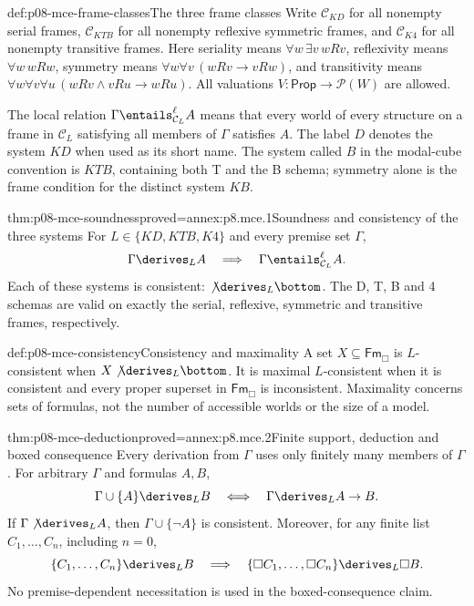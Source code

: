 \begin{hbdefinition}{def:p08-mce-frame-classes}{The three frame classes}
Write \(\mathcal C_{KD}\) for all nonempty serial frames,
\(\mathcal C_{KTB}\) for all nonempty reflexive symmetric frames, and
\(\mathcal C_{K4}\) for all nonempty transitive frames. Here seriality
means \(\forall w\,\exists v\,wRv\), reflexivity means
\(\forall w\,wRw\), symmetry means
\(\forall w\forall v\,(wRv\to vRw)\), and transitivity means
\(\forall w\forall v\forall u\,(wRv\land vRu\to wRu)\).
All valuations \(V:\mathsf{Prop}\to\mathcal{P}(W)\) are allowed.

The local relation \(\Gamma\entails^{\ell}_{\mathcal C_L}A\) means
that every world of every structure on a frame in \(\mathcal C_L\)
satisfying all members of \(\Gamma\) satisfies \(A\).
The label \(D\) denotes the system \(KD\) when used as its short name.
The system called \(B\) in the modal-cube convention is \(KTB\),
containing both T and the B schema; symmetry alone is the frame condition
for the distinct system \(KB\).
\end{hbdefinition}

\begin{hblemma}{thm:p08-mce-soundness}{proved=annex:p8.mce.1}{Soundness and consistency of the three systems}
For \(L\in\{KD,KTB,K4\}\) and every premise set \(\Gamma\),
\[
 \Gamma\derives_L A\quad\Longrightarrow\quad
 \Gamma\entails^{\ell}_{\mathcal C_L}A.
\]
Each of these systems is consistent: \(\not\derives_L\bottom\).
The D, T, B and 4 schemas are valid on exactly the serial, reflexive,
symmetric and transitive frames, respectively.
\end{hblemma}

\begin{hbdefinition}{def:p08-mce-consistency}{Consistency and maximality}
A set \(X\subseteq\mathsf{Fm}_{\Box}\) is \(L\)-consistent when
\(X\not\derives_L\bottom\). It is maximal \(L\)-consistent when
it is consistent and every proper superset in \(\mathsf{Fm}_{\Box}\)
is inconsistent. Maximality concerns sets of formulas, not the number of
accessible worlds or the size of a model.
\end{hbdefinition}

\begin{hblemma}{thm:p08-mce-deduction}{proved=annex:p8.mce.2}{Finite support, deduction and boxed consequence}
Every derivation from \(\Gamma\) uses only finitely many members of
\(\Gamma\). For arbitrary \(\Gamma\) and formulas \(A,B\),
\[
 \Gamma\cup\{A\}\derives_L B
 \quad\Longleftrightarrow\quad
 \Gamma\derives_L A\to B.
\]
If \(\Gamma\not\derives_L A\), then
\(\Gamma\cup\{\neg A\}\) is consistent. Moreover, for any finite
list \(C_1,\ldots,C_n\), including \(n=0\),
\[
 \{C_1,\ldots,C_n\}\derives_L B
 \quad\Longrightarrow\quad
 \{\Box C_1,\ldots,\Box C_n\}\derives_L\Box B.
\]
No premise-dependent necessitation is used in the boxed-consequence claim.
\end{hblemma}

